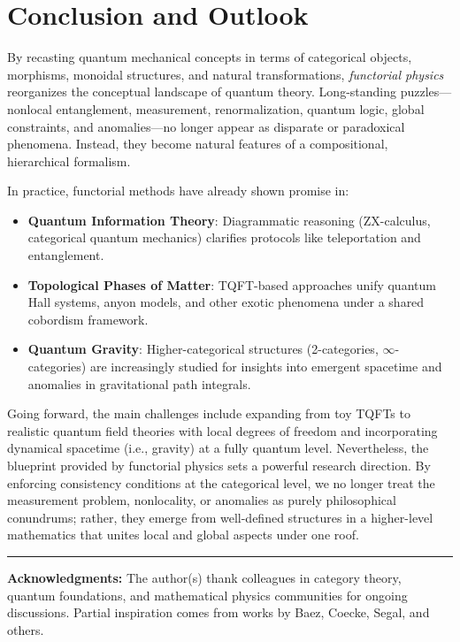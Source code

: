 \documentclass[12pt]{article}
\begin{document}
\vspace{1em}

\section{Conclusion and Outlook}
By recasting quantum mechanical concepts in terms of categorical objects, morphisms, monoidal structures, and natural transformations, \emph{functorial physics} reorganizes the conceptual landscape of quantum theory. Long-standing puzzles---nonlocal entanglement, measurement, renormalization, quantum logic, global constraints, and anomalies---no longer appear as disparate or paradoxical phenomena. Instead, they become natural features of a compositional, hierarchical formalism.

In practice, functorial methods have already shown promise in:

\begin{itemize}
    \item \textbf{Quantum Information Theory}: Diagrammatic reasoning (ZX-calculus, categorical quantum mechanics) clarifies protocols like teleportation and entanglement.  
    \item \textbf{Topological Phases of Matter}: TQFT-based approaches unify quantum Hall systems, anyon models, and other exotic phenomena under a shared cobordism framework.  
    \item \textbf{Quantum Gravity}: Higher-categorical structures (2-categories, \(\infty\)-categories) are increasingly studied for insights into emergent spacetime and anomalies in gravitational path integrals.
\end{itemize}

Going forward, the main challenges include expanding from toy TQFTs to realistic quantum field theories with local degrees of freedom and incorporating dynamical spacetime (i.e., gravity) at a fully quantum level. Nevertheless, the blueprint provided by functorial physics sets a powerful research direction. By enforcing consistency conditions at the categorical level, we no longer treat the measurement problem, nonlocality, or anomalies as purely philosophical conundrums; rather, they emerge from well-defined structures in a higher-level mathematics that unites local and global aspects under one roof.

\vspace{1em}
\hrule
\vspace{1em}

\noindent\textbf{Acknowledgments:}  
The author(s) thank colleagues in category theory, quantum foundations, and mathematical physics communities for ongoing discussions. Partial inspiration comes from works by Baez, Coecke, Segal, and others.
\end{document}
